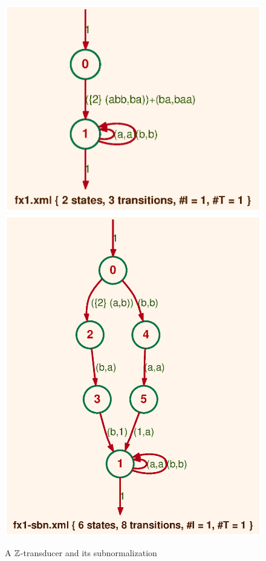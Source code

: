 \begin{figure}[ht]
    \centering
\includegraphics[scale=0.5]{figures/fx1.ps}
\ee
\includegraphics[scale=0.5]{figures/fx1-sbn.ps}
\caption{A $\mathbb{Z}$-transducer and its subnormalization}
\label{fig:sbn}
\end{figure}

